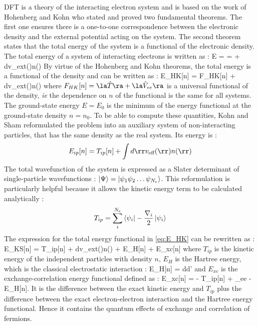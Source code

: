 \gls{DFT} is a theory of the interacting electron system and is based on the work of Hohenberg and Kohn who stated and proved two fundamental theorems. \cite{hohenberg1964} The first one ensures there is a one-to-one correspondence between the electronic density and the external potential acting on the system. The second theorem states that the total energy of the system is a functional of the electronic density.
The total energy of a system of interacting electrons is written as :
\be
	E =  =  + \int d\rr v_{ext}(\rr)n(\rr)
\ee
By virtue of the Hohenberg and Kohn theorems, the total energy is a functional of the density and can be written as :
\be
 	E_{HK}[n] = F_{HK}[n] + \int d\rr v_{ext}(\rr)n(\rr)
	\label{eq:E_HK}
\ee
where $F_{HK}[n] = \la \hat{T} \ra + \la \hat{V}_{ee} \ra$ is a universal functional of the density, \emph{ie} the dependence on $n$ of the functional is the same for all systems. The ground-state energy $E = E_0$ is the minimum of the energy functional at the ground-state density $n=n_0$. To be able to compute these quantities, Kohn and Sham reformulated the problem into an auxiliary system of non-interacting particles, that has the same density as the real system.\cite{kohn1965} Its energy is :
\begin{equation}
	E_{ip}[n] = T_{ip}[n] + \int d\rr v_{\text{eff}}(\rr)n(\rr)
\end{equation}	
The total wavefunction of the system is expressed as a Slater determinant of single-particle wavefunctions : $\ket{\Psi} =\ket{\psi_1\psi_2 \ldots \psi_{N_e}}$. This reformulation is particularly helpful because it allows the kinetic energy term to be calculated analytically :
\begin{equation}
	T_{ip} =  \sum_i^{N_e} \bra{\psi_i}-\frac{\nabla_i}{2} \ket{\psi_i}
\end{equation}
The expression for the total energy functional in \ref{eq:E_HK} can be rewritten as :
\be
	E_{KS}[n] = T_{ip}[n] + \int d\rr v_{ext}(\rr)n(\rr) + E_H[n] + E_{xc}[n]
\ee
where $T_{ip}$ is the kinetic energy of the independent particles with density $n$, $E_H$ is the Hartree energy, which is the classical electrostatic interaction :
\be
	E_H[n] = \int d\rr d\rr' 
	\label{eq:E_Hartree}
\ee
and $E_{xc}$ is the exchange-correlation energy functional defined as :
\be
	E_{xc}[n] = \langle {} \rangle - T_{ip}[n] + \langle {}_{ee} \rangle - E_H[n].
\ee
It is the difference between the exact kinetic energy and $T_{ip}$ plus the difference between the exact electron-electron interaction and the Hartree energy functional. Hence it contains the quantum effects of exchange and correlation of fermions.

